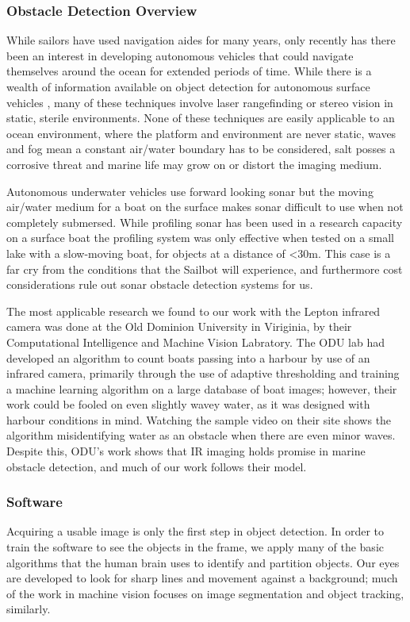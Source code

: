 
\subsubsection{\label{sec:discussion:theory:detectionoverview}Obstacle Detection Overview}
While sailors have used navigation aides for many years, only recently has there been an interest in developing autonomous vehicles that could navigate themselves around the ocean for extended periods of time. While there is a wealth of information available on object detection for autonomous surface vehicles \cite{detection-offroad} \cite{optical-flow-detection} \cite{unmanned-ground-vehicles}, many of these techniques involve laser rangefinding or stereo vision in static, sterile environments. None of these techniques are easily applicable to an ocean environment, where the platform and environment are never static, waves and fog mean a constant air/water boundary has to be considered, salt posses a corrosive threat and marine life may grow on or distort the imaging medium. 

Autonomous underwater vehicles use forward looking sonar but the moving air/water medium for a boat on the surface makes sonar difficult to use when not completely submersed. While profiling sonar has been used in a research capacity on a surface boat\cite{ASV-sonar} the profiling system was only effective when tested on a small lake with a slow-moving boat, for objects at a distance of <30m. This case is a far cry from the conditions that the Sailbot will experience, and furthermore cost considerations rule out sonar obstacle detection systems for us.


The most applicable research we found to our work with the Lepton infrared camera was done at the Old Dominion University in Viriginia, by their Computational Intelligence and Machine Vision Labratory. The ODU lab had developed an algorithm to count boats passing into a harbour by use of an infrared camera, primarily through the use of adaptive thresholding and training a machine learning algorithm on a large database of boat images; however, their work could be fooled on even slightly wavey water, as it was designed with harbour conditions in mind. Watching the sample video on their site shows the algorithm misidentifying water as an obstacle when there are even minor waves.\cite{ODU-boat-IR-detection} Despite this, ODU's work shows that IR imaging holds promise in marine obstacle detection, and much of our work follows their model.

\subsubsection{\label{sec:discussion:theory:detectionsoftware}Software}
Acquiring a usable image is only the first step in object detection. In order to train the software to see the objects in the frame, we apply many of the basic algorithms that the human brain uses to identify and partition objects. Our eyes are developed to look for sharp lines and movement against a background; much of the work in machine vision focuses on image segmentation and object tracking, similarly. 

